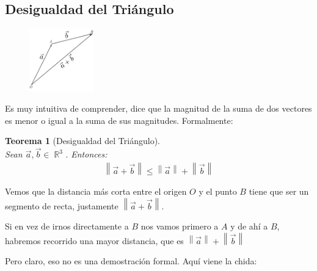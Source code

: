 \documentclass[12pt, fleqn]{report}                             %
\newcommand \ForceNewLine {$\Space$\\}                          %
\DeclareMathOperator \Space {\quad}                             %
\newtheorem{Theorem}{Teorema}[section]                          %
\theoremstyle{break}                                            %
\DeclareMathOperator \Reals        {\mathbb{R}}                 %
\newcommand{\Abs}[1]{\left\lVert #1 \right\lVert}               %
\begin{document}
            \clearpage
            \subsection{Desigualdad del Triángulo}

                \begin{figure}
                    \centering
                    \includegraphics[width=0.25\textwidth]{triangleInequality.png}
                    \label{Con dibujitos :3}
                \end{figure}
            
                Es muy intuitiva de comprender, dice que la magnitud de la suma de dos vectores es menor o
                igual a la suma de sus magnitudes. Formalmente:
                
                \begin{Theorem}[Desigualdad del Triángulo]
                    \ForceNewLine
                    Sean $\vec{a}, \vec{b} \in \Reals^3$. Entonces:
                    \begin{align*}
                        \Abs{\vec{a}+\vec{b}} \leq \Abs{\vec{a}} + \Abs{\vec{b}}
                    \end{align*}
                \end{Theorem}
            
                Vemos que la distancia más corta entre el origen $O$ y el punto $B$ tiene que ser
                un segmento de recta, justamente $\Abs{\vec{a} + \vec{b}}$.

                Si en vez de irnos directamente a $B$ nos vamos primero a $A$ y de ahí a $B$, habremos
                recorrido una mayor distancia, que es $\Abs{\vec{a}} + \Abs{\vec{b}}$

                Pero claro, eso no es una demostración formal. Aquí viene la chida:
\end{document}
